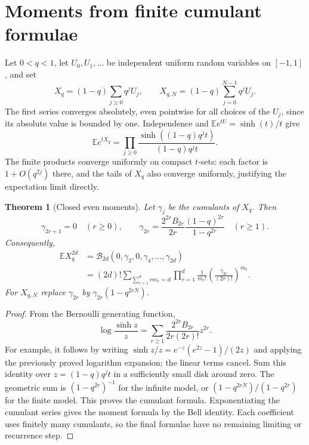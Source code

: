 \documentclass[11pt,a4paper,oneside,openany]{book}
\newtheorem{theorem}{Theorem}[chapter]
\theoremstyle{definition}
\theoremstyle{remark}
\newcommand{\Yc}{\mathcal B}
\begin{document}
\section{Moments from finite cumulant formulae}
Let $0<q<1$, let $U_0,U_1,\ldots$ be independent uniform random variables
on $[-1,1]$, and set
\begin{equation}
 X_q=(1-q)\sum_{j\ge0}q^jU_j,\qquad
 X_{q,N}=(1-q)\sum_{j=0}^{N-1}q^jU_j.
 \label{q3:eq:uniform-model}
\end{equation}
The first series converges absolutely, even pointwise for all choices
of the $U_j$, since its absolute value is bounded by one. Independence
and $\mathbb E e^{tU}=\sinh(t)/t$ give
\begin{equation}
 \mathbb E e^{tX_q}
   =\prod_{j\ge0}\frac{\sinh((1-q)q^jt)}{(1-q)q^jt}.
 \label{q3:eq:uniform-mgf}
\end{equation}
The finite products converge uniformly on compact $t$-sets: each
factor is $1+O(q^{2j})$ there, and the tails of $X_q$ also converge
uniformly, justifying the expectation limit directly.

\begin{theorem}[Closed even moments]
Let $\gamma_j$ be the cumulants of $X_q$. Then
\begin{equation}
 \gamma_{2r+1}=0\quad(r\ge0),\qquad
 \gamma_{2r}=\frac{2^{2r}B_{2r}}{2r}
                \frac{(1-q)^{2r}}{1-q^{2r}}
       \quad(r\ge1).
 \label{q3:eq:uniform-cumulants}
\end{equation}
Consequently,
\begin{align}
 \mathbb E X_q^{2d}
   &=\Yc_{2d}(0,\gamma_2,0,\gamma_4,\ldots,\gamma_{2d})
 \label{q3:eq:uniform-moments-bell}\\
   &=(2d)!\sum_{\sum_{r=1}^d r m_r=d}
          \prod_{r=1}^d\frac1{m_r!}
                 \left(\frac{\gamma_{2r}}{(2r)!}\right)^{m_r}.
 \label{q3:eq:uniform-moments-profile}
\end{align}
For $X_{q,N}$ replace $\gamma_{2r}$ by
$\gamma_{2r}(1-q^{2rN})$.
\end{theorem}
\begin{proof}
From the Bernoulli generating function,
\[
 \log\frac{\sinh z}{z}
    =\sum_{r\ge1}\frac{2^{2r}B_{2r}}{2r(2r)!}z^{2r}.
\]
For example, it follows by writing
$\sinh z/z=e^{-z}(e^{2z}-1)/(2z)$ and applying the previously proved
logarithm expansion; the linear terms cancel. Sum this identity over
$z=(1-q)q^jt$ in a sufficiently small disk around zero. The geometric
sum is $(1-q^{2r})^{-1}$ for the infinite model, or
$(1-q^{2rN})/(1-q^{2r})$ for the finite model. This proves the cumulant
formula. Exponentiating the cumulant series gives the moment formula
by the Bell identity. Each coefficient uses finitely many cumulants,
so the final formulae have no remaining limiting or recurrence step.
\end{proof}
\end{document}
